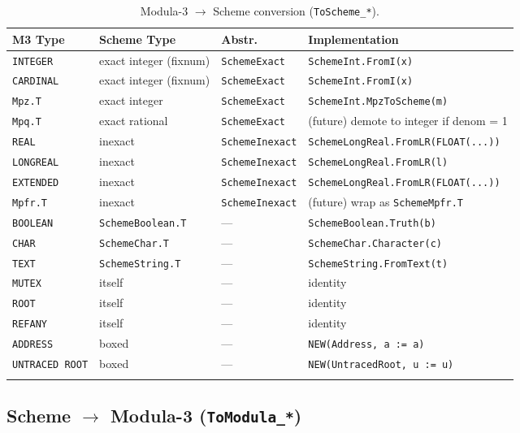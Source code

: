 \documentclass[12pt]{article}
\begin{document}
\small
\begin{longtable}{llll}
\toprule
\textbf{M3 Type} & \textbf{Scheme Type} & \textbf{Abstr.} &
  \textbf{Implementation} \\
\midrule
\endhead
{\tt INTEGER} & exact integer (fixnum) & {\tt SchemeExact} &
  {\tt SchemeInt.FromI(x)} \\
{\tt CARDINAL} & exact integer (fixnum) & {\tt SchemeExact} &
  {\tt SchemeInt.FromI(x)} \\
{\tt Mpz.T} & exact integer & {\tt SchemeExact} &
  {\tt SchemeInt.MpzToScheme(m)} \\
{\tt Mpq.T} & exact rational & {\tt SchemeExact} &
  (future) demote to integer if denom = 1 \\
{\tt REAL} & inexact & {\tt SchemeInexact} &
  {\tt SchemeLongReal.FromLR(FLOAT(...))} \\
{\tt LONGREAL} & inexact & {\tt SchemeInexact} &
  {\tt SchemeLongReal.FromLR(l)} \\
{\tt EXTENDED} & inexact & {\tt SchemeInexact} &
  {\tt SchemeLongReal.FromLR(FLOAT(...))} \\
{\tt Mpfr.T} & inexact & {\tt SchemeInexact} &
  (future) wrap as {\tt SchemeMpfr.T} \\
{\tt BOOLEAN} & {\tt SchemeBoolean.T} & --- &
  {\tt SchemeBoolean.Truth(b)} \\
{\tt CHAR} & {\tt SchemeChar.T} & --- &
  {\tt SchemeChar.Character(c)} \\
{\tt TEXT} & {\tt SchemeString.T} & --- &
  {\tt SchemeString.FromText(t)} \\
{\tt MUTEX} & itself & --- &
  identity \\
{\tt ROOT} & itself & --- &
  identity \\
{\tt REFANY} & itself & --- &
  identity \\
{\tt ADDRESS} & boxed & --- &
  {\tt NEW(Address, a := a)} \\
{\tt UNTRACED ROOT} & boxed & --- &
  {\tt NEW(UntracedRoot, u := u)} \\
\bottomrule
\caption{Modula-3 $\to$ Scheme conversion ({\tt ToScheme\_*}).}
\label{tab:m3-to-scheme}
\end{longtable}

\subsection{Scheme $\to$ Modula-3 ({\tt ToModula\_*})}
\label{sec:scheme-to-m3}
\end{document}
